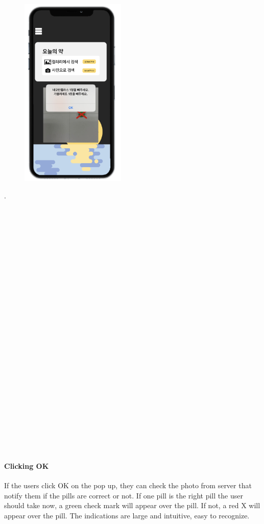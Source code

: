 \documentclass[conference]{IEEEtran}
\begin{document}
\begin{figure}[h!]
\centering
\includegraphics[width=5cm]{final_image_folder/today_result.png}
\caption{}
\label{fig:map}
\end{figure}
.\\
\\
\\
\\
\\
\\
\\
\\
\\
\\
\\
\\
\\
\\
\\
\\
\\
\\
\\
\\
\\
\\
\\
\\
\\
\\

\paragraph{Clicking OK} If the users click OK on the pop up, they can check the photo from server that notify them if the pills are correct or not. If one pill is the right pill the user should take now, a green check mark will appear over the pill. If not, a red X will appear over the pill. The indications are large and intuitive, easy to recognize. \\
\end{document}
